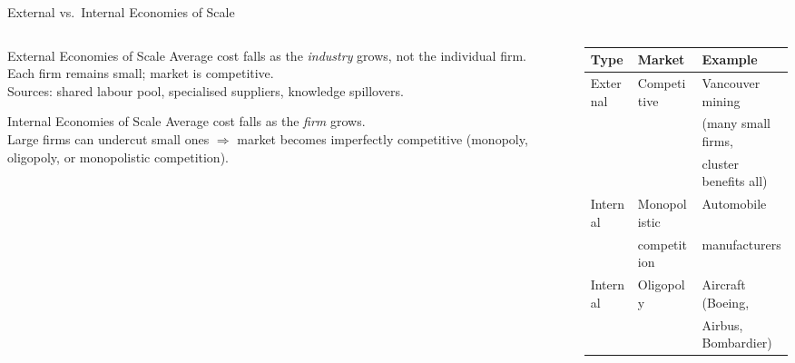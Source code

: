 \documentclass[aspectratio=169]{beamer}
\begin{document}
\begin{frame}{External vs.\ Internal Economies of Scale}
\begin{columns}
\begin{column}{0.5\textwidth}
\begin{block}{External Economies of Scale}
  Average cost falls as the \emph{industry} grows, not the individual firm.\\[0.2em]
  Each firm remains small; market is competitive.\\[0.2em]
  Sources: shared labour pool, specialised suppliers, knowledge spillovers.
\end{block}
\vspace{0.3em}
\begin{block}{Internal Economies of Scale}
  Average cost falls as the \emph{firm} grows.\\[0.2em]
  Large firms can undercut small ones $\Rightarrow$ market becomes imperfectly competitive (monopoly, oligopoly, or monopolistic competition).
\end{block}
\end{column}
\begin{column}{0.47\textwidth}
\begin{adjustbox}{max width=\columnwidth}
\begin{tabular}{lll}
\toprule
\textbf{Type} & \textbf{Market} & \textbf{Example}\\
\midrule
External & Competitive & Vancouver mining\\
 & & (many small firms,\\
 & & cluster benefits all)\\
\midrule
Internal & Monopolistic & Automobile\\
 & competition & manufacturers\\
\midrule
Internal & Oligopoly & Aircraft (Boeing,\\
 & & Airbus, Bombardier)\\
\bottomrule
\end{tabular}
\end{adjustbox}
\end{column}
\end{columns}
\end{frame}
\end{document}
